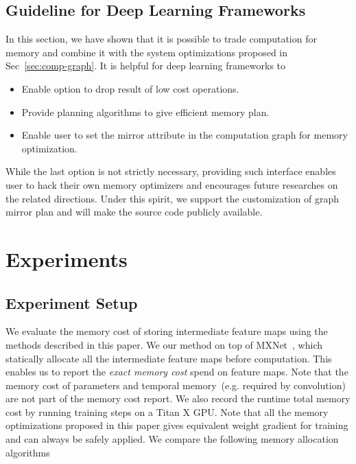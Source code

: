 \documentclass{article} %
\newcommand{\presec}{\vspace*{-2pt}}
\newcommand{\postsec}{\vspace*{-2pt}} %
\begin{document}
\subsection{Guideline for Deep Learning Frameworks}
In this section, we have shown that it is possible to trade computation for memory  and
combine it with the system optimizations proposed in Sec~\ref{sec:comp-graph}. It is helpful for deep learning frameworks to
\begin{itemize}
\item Enable option to drop result of low cost operations.
\item Provide planning algorithms to give efficient memory plan.
\item Enable user to set the mirror attribute in the computation graph for memory optimization.
\end{itemize}
While the last option is not strictly necessary, providing such interface enables user to hack their own memory optimizers
and encourages future researches on the related directions.
Under this spirit, we support the customization of graph mirror plan and will make the source code publicly available.

\presec
\section{Experiments}
\postsec

\subsection{Experiment Setup}

We evaluate the memory cost of storing intermediate feature maps using the methods described in this paper.
We our method on top of MXNet~\cite{MXNet-whitepaper}, which statically allocate all the intermediate feature
maps before computation. This enables us to report the \emph{exact memory cost} spend on feature maps.
Note that the memory cost of parameters and temporal memory~(e.g. required by convolution) are not part of the memory cost report.
We also record the runtime total memory cost  by running training steps on a Titan X GPU.
Note that all the memory optimizations proposed in this paper gives equivalent weight gradient for training and can always be safely applied.
We compare the following memory allocation algorithms
\end{document}
